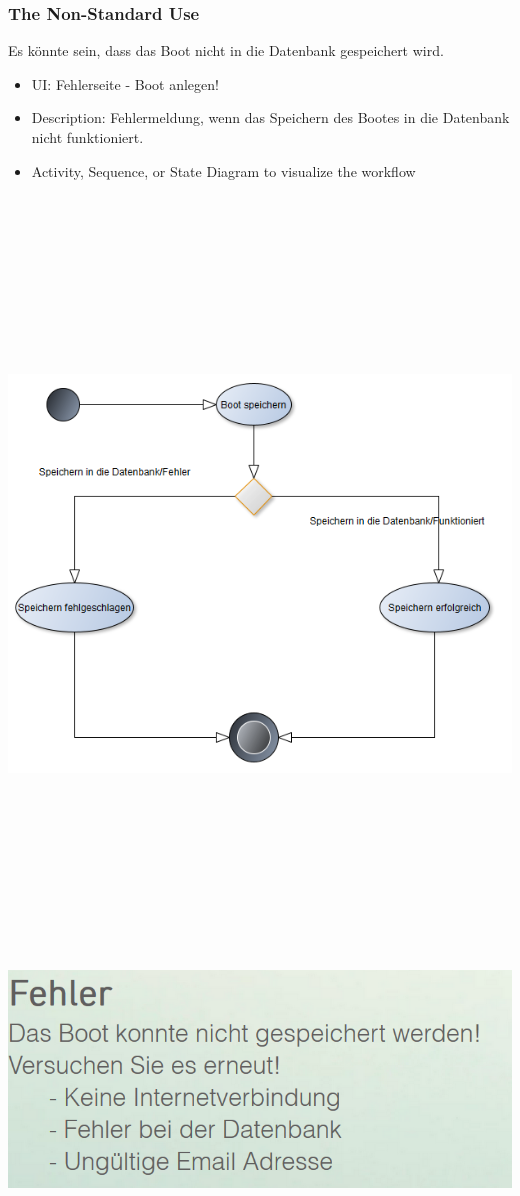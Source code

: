 \documentclass[12pt]{article}
\theoremstyle{definition}
\begin{document}
\subsubsection{The Non-Standard Use}
Es könnte sein, dass das Boot nicht in die Datenbank gespeichert wird.
\begin{itemize}
	\item UI: Fehlerseite - Boot anlegen!
	\item Description: Fehlermeldung, wenn das Speichern des Bootes in die Datenbank nicht funktioniert.
	\item Activity, Sequence, or State Diagram to visualize the workflow
\end{itemize}
\begin{center}\includegraphics[width=15cm,height=20cm,keepaspectratio]{Boot_anlegen_Fehler.PNG}\end{center}
\includegraphics[height=0.40\textwidth]{Boot_anlegen-Fehler.PNG}
\pagebreak
\end{document}
